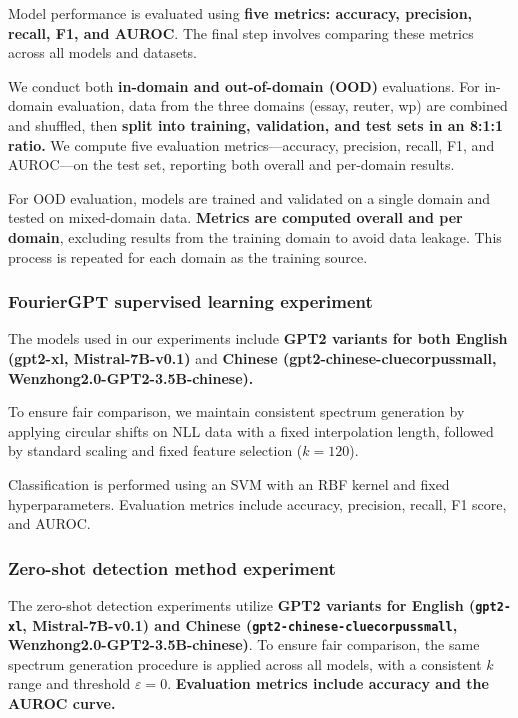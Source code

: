 \documentclass[lettersize,journal]{IEEEtran}
\begin{document}
Model performance is evaluated using \textbf{five metrics: accuracy, precision, recall, F1, and AUROC}. The final step involves comparing these metrics across all models and datasets.

 We conduct both \textbf{in-domain and out-of-domain (OOD)} evaluations. For in-domain evaluation, data from the three domains (essay, reuter, wp) are combined and shuffled, then \textbf{split into training, validation, and test sets in an 8:1:1 ratio.} We compute five evaluation metrics—accuracy, precision, recall, F1, and AUROC—on the test set, reporting both overall and per-domain results. 
 
 For OOD evaluation, models are trained and validated on a single domain and tested on mixed-domain data. \textbf{Metrics are computed overall and per domain}, excluding results from the training domain to a\textbf{}void data leakage. This process is repeated for each domain as the training source.



\subsubsection{FourierGPT supervised learning experiment}

The models used in our experiments include \textbf{GPT2 variants for both English (gpt2-xl, Mistral-7B-v0.1)} and \textbf{Chinese (gpt2-chinese-cluecorpussmall, Wenzhong2.0-GPT2-3.5B-chinese). }

To ensure fair comparison, we maintain consistent spectrum generation by applying circular shifts on NLL data with a fixed interpolation length, followed by standard scaling and fixed feature selection (\(k=120\)). 

Classification is performed using an SVM with an RBF kernel and fixed hyperparameters. Evaluation metrics include accuracy, precision, recall, F1 score, and AUROC.



\subsubsection{Zero-shot detection method experiment}
The zero-shot detection experiments utilize\textbf{ GPT2 variants for English (\texttt{gpt2-xl}, Mistral-7B-v0.1) and Chinese (\texttt{gpt2-chinese-cluecorpussmall}, Wenzhong2.0-GPT2-3.5B-chinese)}. To ensure fair comparison, the same spectrum generation procedure is applied across all models, with a consistent \(k\) range and threshold \(\varepsilon = 0\). \textbf{Evaluation metrics include accuracy and the AUROC curve.}
\end{document}
